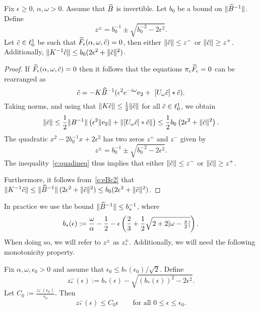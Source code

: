 \begin{lemma}\label{lem:thecone}
	Fix $ \epsilon \geq 0$, $\alpha,\omega>0$.
	Assume that $\widehat{B}$ is invertible.
	Let $b_0$ be a bound on $\| \widehat{B}^{-1} \|$.
	Define 
	\[
	z^{\pm} = b_0^{-1} \pm \sqrt{b_0^{-2}-  2\epsilon^2 } .
	\]
	Let $ \tilde{c} \in \ell^1_0$ be such that $\widetilde{F}_\epsilon(\alpha, \omega,\tilde{c}) = 0$, then either $ \|\tilde{c}\| \leq  z^-$ or $  \|\tilde{c}\| \geq z^+ $. 
	\noindent
	Additionally, $ \| K^{-1} \tilde{c} \| \leq b_0 (2\epsilon^2+ \|\tilde{c}\|^2)$.
\end{lemma}

\begin{proof}
	If  $ \widetilde{F}_\epsilon( \alpha, \omega, \tilde{c}) =0$ then it follows that the equations $\pi_c \widetilde{F}_\epsilon=0$ can be rearranged as 
\begin{equation}\label{e:eBc2}
  \tilde{c} = - K \widehat{B}^{-1} (  \epsilon^2  e^{- i \omega} \mathrm{e}_2 + \ [ U_{\omega} \tilde{c} ] * \tilde{c} ) .
\end{equation}
	Taking norms, and using that $\| K \tilde{c} \| \leq \frac{1}{2} \| \tilde{c}\|$ for all $\tilde{c}\in \ell^1_0$, we obtain 
\begin{equation}\label{e:quadineq}
\|\tilde{c} \|  \leq  \frac{1}{2} \| B^{-1}\| \left( \epsilon^2 \|\mathrm{e}_2\|  + \| [ U_{\omega} \tilde{c} ] * \tilde{c} \| \right)
\leq \frac{1}{2} b_0 \left( 2 \epsilon^2  + \| \tilde{c} \|^2 \right).
\end{equation}
The quadratic $x^2 - 2 b_0^{-1} x +   2\epsilon^2 $
has two zeros $z^+$ and $ z^-$ given by
	\[
	z^{\pm} = b_0^{-1} \pm \sqrt{b_0^{-2}-  2\epsilon^2 } .
	\]
The inequality~\eqref{e:quadineq} thus implies that either $ \|\tilde{c}\| \leq z^-$ or $ \|\tilde{c}\| \geq z^+$.

Furthermore, it follows from~\eqref{e:eBc2} that $\| K^{-1} \tilde{c} \| \leq  \| \widehat{B}^{-1} \| \, (2 \epsilon^2 + \|\tilde{c} \|^2) \leq b_0 (2 \epsilon^2+ \|\tilde{c}\|^2)$.
\end{proof}

In practice we use the bound $\| \widehat{B}^{-1} \| \leq b_*^{-1}$,
where
\[
  b_*(\epsilon) := \frac{\omega}{\alpha} - \frac{1}{2} - \epsilon  \left(\frac{2}{3}+ \frac{1}{2}\sqrt{2 + 2 |\omega-\tfrac{\pi}{2}| } \right).
\]
When doing so, we will refer to $z^\pm$ as $ z^\pm_*$. 
Additionally, we will need the following monotonicity property.
\begin{lemma}
	\label{lem:ZminusBound}
	Fix $\alpha, \omega, \epsilon_0 >0$ and assume that $ \epsilon_0 \leq b_*(\epsilon_0) /\sqrt{2}$.
	Define 
\[
  z_*^- (\epsilon):= b_*(\epsilon)-\sqrt{(b_*(\epsilon))^2 -2 \epsilon^2}.
 \]
Let $C_0 := \frac{z_*^-(\epsilon_0)}{\epsilon_0}$.
Then
	\begin{equation}
	 z_*^-(\epsilon) \leq C_0 \epsilon
	 \qquad \text{for all } 0 \leq \epsilon \leq \epsilon_0.
	 \label{eq:ConeLemma}
	\end{equation}
\end{lemma}


